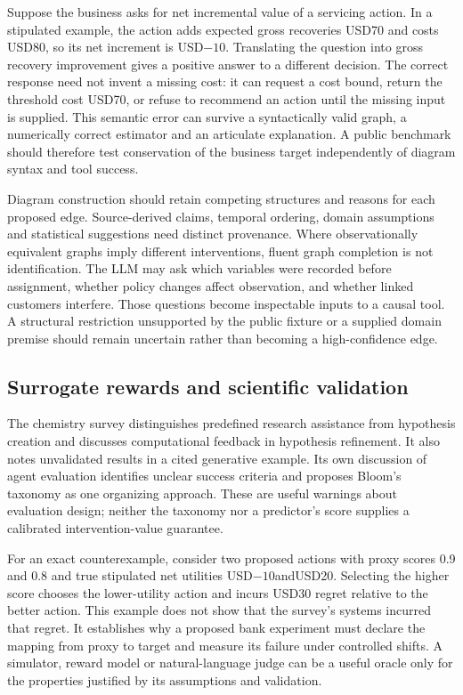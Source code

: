 Suppose the business asks for net incremental value of a servicing action. In a stipulated example, the action adds expected gross recoveries USD70 and costs USD80, so its net increment is USD$-10$. Translating the question into gross recovery improvement gives a positive answer to a different decision. The correct response need not invent a missing cost: it can request a cost bound, return the threshold cost USD70, or refuse to recommend an action until the missing input is supplied. This semantic error can survive a syntactically valid graph, a numerically correct estimator and an articulate explanation. A public benchmark should therefore test conservation of the business target independently of diagram syntax and tool success.~\citep{exec25_cow_reference}

Diagram construction should retain competing structures and reasons for each proposed edge. Source-derived claims, temporal ordering, domain assumptions and statistical suggestions need distinct provenance. Where observationally equivalent graphs imply different interventions, fluent graph completion is not identification. The LLM may ask which variables were recorded before assignment, whether policy changes affect observation, and whether linked customers interfere. Those questions become inspectable inputs to a causal tool. A structural restriction unsupported by the public fixture or a supplied domain premise should remain uncertain rather than becoming a high-confidence edge.~\citep{exec25_cow_reference}

\subsection{Surrogate rewards and scientific validation}

The chemistry survey distinguishes predefined research assistance from hypothesis creation and discusses computational feedback in hypothesis refinement. It also notes unvalidated results in a cited generative example. Its own discussion of agent evaluation identifies unclear success criteria and proposes Bloom's taxonomy as one organizing approach. These are useful warnings about evaluation design; neither the taxonomy nor a predictor's score supplies a calibrated intervention-value guarantee.~\citep{exec25_cow_chemistry}

For an exact counterexample, consider two proposed actions with proxy scores 0.9 and 0.8 and true stipulated net utilities USD$-10$andUSD20. Selecting the higher score chooses the lower-utility action and incurs USD30 regret relative to the better action. This example does not show that the survey's systems incurred that regret. It establishes why a proposed bank experiment must declare the mapping from proxy to target and measure its failure under controlled shifts. A simulator, reward model or natural-language judge can be a useful oracle only for the properties justified by its assumptions and validation.~\citep{exec25_cow_reference}

